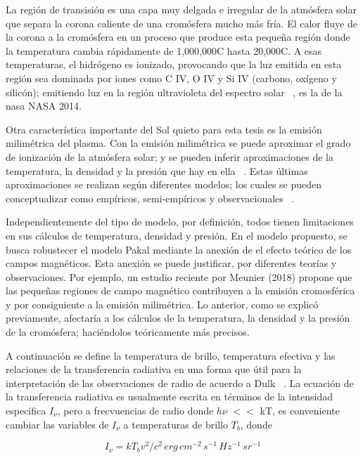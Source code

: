 La región de transisión es una capa muy delgada e irregular de la atmósfera solar que separa la corona caliente de una cromósfera mucho más fría. El calor fluye de la corona a la cromósfera en un proceso que produce esta pequeña regi\'on donde la temperatura cambia rápidamente de 1,000,000C hasta 20,000C. A esas temperaturas, el hidrógeno es ionizado, provocando que la luz emitida en esta región sea dominada por iones como C IV, O IV y Si IV (carbono, oxígeno y silicón); emitiendo luz en la región ultravioleta del espectro solar ~\citep{NASAtr}, es la de la nasa NASA 2014.

Otra caracter\'istica importante del Sol quieto para esta tesis es la emisi\'on milim\'etrica del plasma. Con la emisi\'on milim\'etrica se puede aproximar el grado de ionizaci\'on de la atm\'osfera solar; y se pueden inferir aproximaciones de la temperatura, la densidad y la presi\'on que hay en ella ~\citep{millimeter}. Estas \'ultimas aproximaciones se realizan seg\'un diferentes modelos; los cuales se pueden conceptualizar como emp\'iricos, semi-emp\'iricos y observacionales ~\citep{2010ApJS..188..437D}.

Independientemente del tipo de modelo, por definici\'on, todos tienen limitaciones en sus c\'alculos de temperatura, densidad y presi\'on. En el modelo propuesto, se busca robustecer el modelo Pakal mediante la anexi\'on de el efecto te\'orico de los campos magn\'eticos. Esta anexi\'on se puede justificar, por diferentes teor\'ias y observaciones. Por ejemplo, un estudio reciente por Meunier (2018) propone que las peque\~nas regiones de campo magn\'etico contribuyen a la emisi\'on cromosf\'erica y por consiguiente a la emisi\'on milim\'etrica. Lo anterior, como se explic\'o previamente, afectar\'ia a los c\'alculos de la temperatura, la densidad y la presi\'on de la crom\'osfera; haci\'endolos te\'oricamente m\'as precisos.

A continuaci\'on se define la temperatura de brillo, temperatura efectiva y las relaciones de la transferencia radiativa en una forma que \'util para la interpretaci\'on de las observaciones de radio de acuerdo a Dulk ~\citep{dulk_stars}. La ecuaci\'on de la transferencia radiativa es usualmente escrita en t\'erminos de la intensidad espec\'ifica $I_\nu$, pero a frecvuencias de radio donde \textit{$h\nu$} $<<$ kT, es conveniente cambiar las variables de $I_\nu$ a temperaturas de brillo $T_b$, donde

\begin{equation} \label{temperatura_brillo}
I_\nu = kT_bv^2/c^2\, erg \, cm^{-2} \,s^{-1} \,Hz^{-1} \,sr^{-1}
\end{equation}

